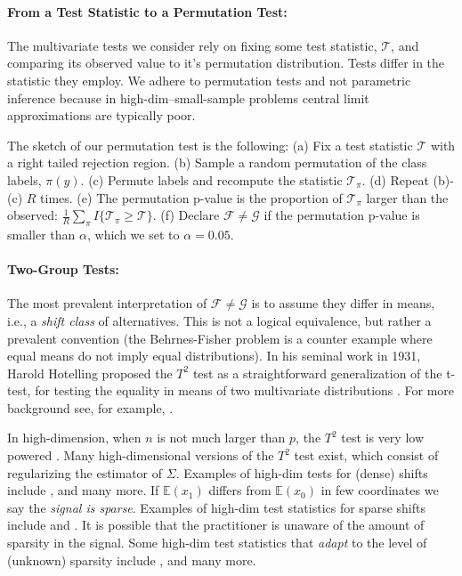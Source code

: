 \documentclass[oupdraft]{bio}
\begin{document}
\paragraph{From a Test Statistic to a Permutation Test:}

The multivariate tests we consider rely on fixing some test statistic, $\mathcal{T}$, and comparing its observed value to it's permutation distribution. 
Tests differ in the statistic they employ.
We adhere to permutation tests and not parametric inference because in high-dim--small-sample problems central limit approximations are typically poor.

The sketch of our permutation test is the following: 
(a) Fix a test statistic $\mathcal{T}$ with a right tailed rejection region. 
(b) Sample a random permutation of the class labels, $\pi(y)$. 
(c) Permute labels and recompute the statistic $\mathcal{T}_\pi$. 
(d) Repeat (b)-(c) $R$ times. 
(e) The permutation p-value is the proportion of  $\mathcal{T}_\pi$ larger than the observed: 
$\frac{1}{R} \sum_{\pi} I\{\mathcal{T}_\pi \geq \mathcal{T}\}$.
(f) Declare $\mathcal{F}\neq \mathcal{G}$ if the permutation p-value is smaller than $\alpha$, which we set to $\alpha=0.05$.



\paragraph{Two-Group Tests:}
The most prevalent interpretation of $\mathcal{F}\neq \mathcal{G}$ is to assume they differ in means, i.e., a \emph{shift class} of alternatives. 
This is not a logical equivalence, but rather a prevalent convention (the Behrnes-Fisher problem is a counter example where equal means do not imply equal distributions). 
In his seminal work in 1931, Harold Hotelling proposed the $T^2$ test as a straightforward generalization of the t-test, for testing the equality in means of two multivariate distributions \citep{hotelling_generalization_1931}. 
For more background see, for example, \cite{anderson_introduction_2003}.

In high-dimension, when $n$ is not much larger than $p$, the $T^2$ test is very low powered \citep{bai1996effect}. 
Many high-dimensional versions of the $T^2$ test exist, which consist of regularizing the estimator of $\Sigma$.
Examples of high-dim tests for (dense) shifts include 
\cite{dempster1958high,bai1996effect,schafer_shrinkage_2005,goeman2006testing,srivastava_test_2008}, and many more.
If $\mathbb{E}(x_1)$ differs from $\mathbb{E}(x_0)$ in few coordinates we say the \emph{signal is sparse}.
Examples of high-dim test statistics for sparse shifts include \cite{cai_two-sample_2013} and \cite{chang2014simulation}.
It is possible that the practitioner is unaware of the amount of sparsity in the signal. 
Some high-dim test statistics that \emph{adapt} to the level of (unknown) sparsity include \cite{simes1986improved,donoho2004higher}, and many more.
\end{document}
